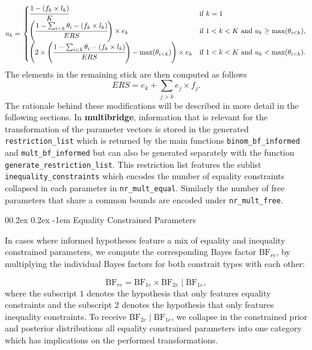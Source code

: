 \documentclass[
  english,
  man,floatsintext]{apa6}
\makeatletter
\let\oldparagraph\paragraph
\renewcommand{\paragraph}[1]{\oldparagraph{#1}\mbox{}}
\renewcommand{\paragraph}{\@startsection{paragraph}{4}{\parindent}%
  {0\baselineskip \@plus 0.2ex \@minus 0.2ex}%
  {-1em}%
  {\normalfont\normalsize\bfseries\itshape\typesectitle}}
\makeatother
\begin{document}
\begin{appendix}
\begin{align}
u_k = \left.
\begin{cases}
\cfrac{1 - (f_k \times l_k)}{K} & \text{if } k = 1 \\
\left( \cfrac{1 - \sum_{i < k} \theta_i - (f_k \times l_k)}{ERS} \right) \times e_k & \text{if } 1 < k < K \text{ and } u_k \geq \text{max}(\theta_{i < k}), \\
\left( 2 \times \left( \cfrac{1 - \sum_{i < k} \theta_i - (f_k \times l_k)}{ERS} \right) - \text{max}(\theta_{i < k}) \right)  \times e_k & \text{if } 1 < k < K \text{ and } u_k < \text{max}(\theta_{i < k}).
\end{cases}
\right.
\end{align} The elements in the remaining stick are then computed as
follows \[ERS = e_k + \sum_{j > k} e_j \times f_j.\] The rationale
behind these modifications will be described in more detail in the
following sections. In \textbf{multibridge}, information that is
relevant for the transformation of the parameter vectors is stored in
the generated \texttt{restriction\_list} which is returned by the main
functions \texttt{binom\_bf\_informed} and \texttt{mult\_bf\_informed}
but can also be generated separately with the function
\texttt{generate\_restriction\_list}. This restriction list features the
sublist \texttt{inequality\_constraints} which encodes the number of
equality constraints collapsed in each parameter in
\texttt{nr\_mult\_equal}. Similarly the number of free parameters that
share a common bounds are encoded under \texttt{nr\_mult\_free}.

\hypertarget{equality-constrained-parameters}{%
\paragraph{Equality Constrained
Parameters}\label{equality-constrained-parameters}}

In cases where informed hypotheses feature a mix of equality and
inequality constrained parameters, we compute the corresponding Bayes
factor \(\text{BF}_{re}\), by multiplying the individual Bayes factors
for both constrait types with each other:

\[
\text{BF}_{re}
= \text{BF}_{1e} \times \text{BF}_{2e} \mid \text{BF}_{1e},
\] where the subscript \(1\) denotes the hypothesis that only features
equality constraints and the subscript \(2\) denotes the hypothesis that
only features inequality constraints. To receive
\(\text{BF}_{2e} \mid \text{BF}_{1e}\), we collapse in the constrained
prior and posterior distributions all equality constrained parameters
into one category which has implications on the performed
transformations.


\end{appendix}
\end{document}
